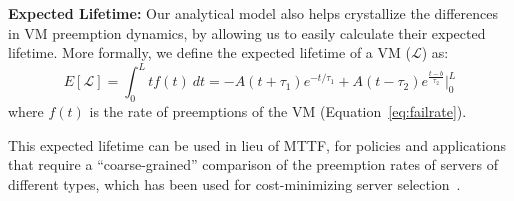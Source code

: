 \noindent \textbf{Expected Lifetime:} Our analytical model also helps crystallize the differences in VM preemption dynamics, by allowing us to easily calculate their expected lifetime. 
More formally, we define the expected lifetime of a VM ($\mathscr{L}$) as: 
\begin{equation}
  \label{eq:expected-lifetime}
E[\mathscr{L}] =  \int_{0}^{L} t {f}(t)~dt =  -A(t+\tau_1)e^{-t/\tau_1} + A(t-\tau_2) e^{\frac{t-b}{\tau_2}} \biggr\rvert_{0}^{L}
\end{equation}
where $f(t)$ is the rate of preemptions of the VM (Equation~\ref{eq:failrate}).
%

This expected lifetime can be used in lieu of MTTF, for policies and applications that require a ``coarse-grained'' comparison of the preemption rates of servers of different types, which has been used for cost-minimizing server selection~\cite{flint}. 









